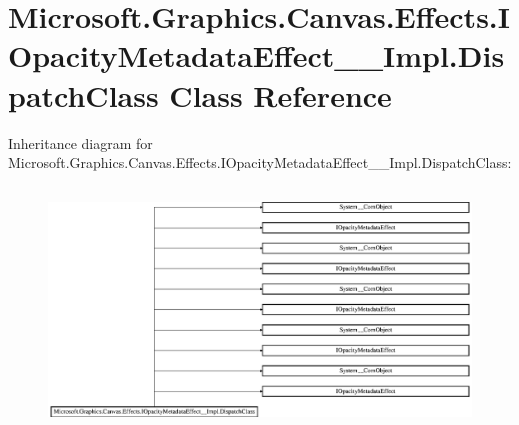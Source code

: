 \hypertarget{class_microsoft_1_1_graphics_1_1_canvas_1_1_effects_1_1_i_opacity_metadata_effect_____impl_1_1_dispatch_class}{}\section{Microsoft.\+Graphics.\+Canvas.\+Effects.\+I\+Opacity\+Metadata\+Effect\+\_\+\+\_\+\+Impl.\+Dispatch\+Class Class Reference}
\label{class_microsoft_1_1_graphics_1_1_canvas_1_1_effects_1_1_i_opacity_metadata_effect_____impl_1_1_dispatch_class}
Inheritance diagram for Microsoft.\+Graphics.\+Canvas.\+Effects.\+I\+Opacity\+Metadata\+Effect\+\_\+\+\_\+\+Impl.\+Dispatch\+Class\+:\begin{figure}[H]
\begin{center}
\leavevmode
\includegraphics[height=6.497890cm]{class_microsoft_1_1_graphics_1_1_canvas_1_1_effects_1_1_i_opacity_metadata_effect_____impl_1_1_dispatch_class}
\end{center}
\end{figure}
